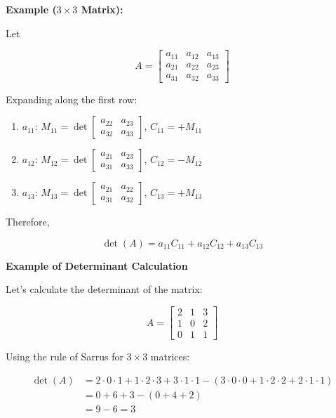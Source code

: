 \textbf{Example (\(3\times3\) Matrix):}

Let

\[
    A = \begin{bmatrix}
        a_{11} & a_{12} & a_{13} \\
        a_{21} & a_{22} & a_{23} \\
        a_{31} & a_{32} & a_{33}
    \end{bmatrix}
\]

Expanding along the first row:

\begin{enumerate}

    \item  \(a_{11}\):  \(M_{11} = \det \begin{bmatrix} a_{22} & a_{23} \\ a_{32} & a_{33} \end{bmatrix}\),  \(C_{11} = +M_{11}\)

    \item  \(a_{12}\):  \(M_{12} = \det \begin{bmatrix} a_{21} & a_{23} \\ a_{31} & a_{33} \end{bmatrix}\),  \(C_{12} = -M_{12}\)

    \item  \(a_{13}\):  \(M_{13} = \det \begin{bmatrix} a_{21} & a_{22} \\ a_{31} & a_{32} \end{bmatrix}\),  \(C_{13} = +M_{13}\)

\end{enumerate}


Therefore,

\[
    \det(A) = a_{11}C_{11} + a_{12}C_{12} + a_{13}C_{13}
\]

\textbf{Example of Determinant Calculation}

Let's calculate the determinant of the matrix:

\[
    A =
    \begin{bmatrix}
        2 & 1 & 3 \\
        1 & 0 & 2 \\
        0 & 1 & 1
    \end{bmatrix}
\]

Using the rule of Sarrus for \(3 \times 3\) matrices:

\begin{align*}
    \det(A) & = 2 \cdot 0 \cdot 1 + 1 \cdot 2 \cdot 3 + 3 \cdot 1 \cdot 1 - (3 \cdot 0 \cdot 0 + 1 \cdot 2 \cdot 2 + 2 \cdot 1 \cdot 1) \\
            & = 0 + 6 + 3 - (0 + 4 + 2)                                                                                                 \\
            & = 9 - 6 = 3
\end{align*}

